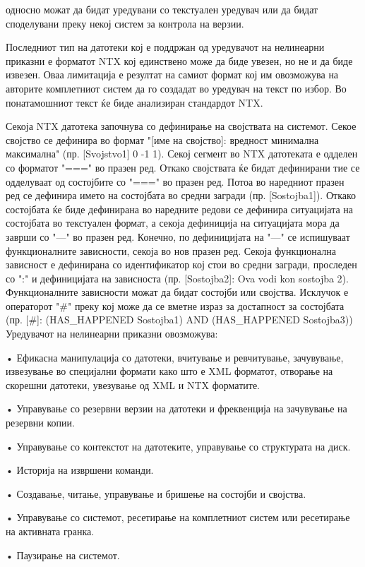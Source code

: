 односно можат да бидат уредувани со текстуален уредувач или да бидат споделувани преку некој систем за контрола на верзии.

Последниот тип на датотеки кој е поддржан од уредувачот на нелинеарни приказни е форматот NTX кој единствено може да биде увезен, но не и да биде извезен. Оваа лимитација е резултат на самиот формат кој им овозможува на авторите комплетниот систем да го создадат во уредувач на текст по избор. Во понатамошниот текст ќе биде анализиран стандардот NTX.

Секоја NTX датотека започнува со дефинирање на својствата на системот. Секое својство се дефинира во формат "[име на својство]: вредност минимална максимална" (пр. [Svojstvo1] 0 -1 1). Секој сегмент во NTX датотеката е одделен со форматот "===" во празен ред. Откако својствата ќе бидат дефинирани тие се одделуваат од состојбите со "===" во празен ред. Потоа во наредниот празен ред се дефинира името на состојбата во средни загради (пр. [Sostojba1]). Откако состојбата ќе биде дефинирана во наредните редови се дефинира ситуацијата на состојбата во текстуален формат, а секоја дефиниција на ситуацијата мора да заврши со "—" во празен ред. Конечно, по дефиницијата на "—" се испишуваат функционалните зависности, секоја во нов празен ред. Секоја функционална зависност е дефинирана со идентификатор кој стои во средни загради, проследен со ":" и дефиницијата на зависноста (пр. [Sostojba2]: Ova vodi kon sostojba 2). Функционалните зависности можат да бидат состојби или својства. Исклучок е операторот "\#" преку кој може да се вметне израз за достапност за состојбата (пр. [\#]: (HAS\_HAPPENED Sostojba1) AND (HAS\_HAPPENED Sostojba3)) Уредувачот на нелинеарни приказни овозможува:

• Ефикасна манипулација со датотеки, вчитување и ревчитување, зачувување, извезување во специјални формати како што е XML форматот, отворање на скорешни датотеки, увезување од XML и NTX форматите.

• Управување со резервни верзии на датотеки и фреквенција на зачувување на резервни копии.

• Управување со контекстот на датотеките, управување со структурата на диск.

• Историја на извршени команди.

• Создавање, читање, управување и бришење на состојби и својства.

• Управување со системот, ресетирање на комплетниот систем или ресетирање на активната гранка.

• Паузирање на системот.


